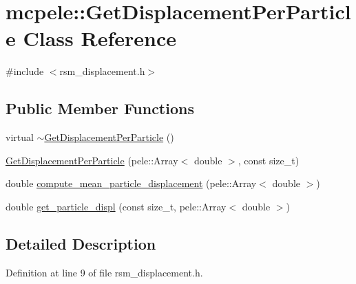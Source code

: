 \hypertarget{classmcpele_1_1GetDisplacementPerParticle}{\section{mcpele\-:\-:\-Get\-Displacement\-Per\-Particle \-Class \-Reference}
\label{classmcpele_1_1GetDisplacementPerParticle}
}


{\ttfamily \#include $<$rsm\-\_\-displacement.\-h$>$}

\subsection*{\-Public \-Member \-Functions}
\begin{DoxyCompactItemize}
\item 
virtual \hyperlink{classmcpele_1_1GetDisplacementPerParticle_a8a6de0c38b3dc64c7a7c4f00fe86e8da}{$\sim$\-Get\-Displacement\-Per\-Particle} ()
\item 
\hyperlink{classmcpele_1_1GetDisplacementPerParticle_afbe836e3aaa986a5328f108491dd4b25}{\-Get\-Displacement\-Per\-Particle} (pele\-::\-Array$<$ double $>$, const size\-\_\-t)
\item 
double \hyperlink{classmcpele_1_1GetDisplacementPerParticle_a8c145ff40848797ae8a1990f408d0082}{compute\-\_\-mean\-\_\-particle\-\_\-displacement} (pele\-::\-Array$<$ double $>$)
\item 
double \hyperlink{classmcpele_1_1GetDisplacementPerParticle_a781391271adacc033a133d18eca2a539}{get\-\_\-particle\-\_\-displ} (const size\-\_\-t, pele\-::\-Array$<$ double $>$)
\end{DoxyCompactItemize}


\subsection{\-Detailed \-Description}


\-Definition at line 9 of file rsm\-\_\-displacement.\-h.



